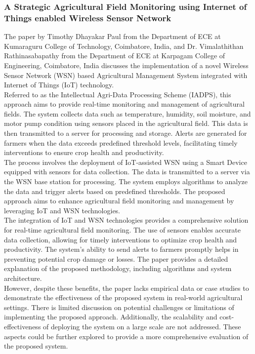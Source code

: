 \documentclass[12pt, a4paper]{article}
\begin{document}
\subsubsection{A Strategic Agricultural Field Monitoring using Internet of Things enabled Wireless Sensor Network}
The paper by Timothy Dhayakar Paul from the Department of ECE at Kumaraguru College of Technology, Coimbatore, India, and Dr. Vimalathithan Rathinasabapathy from the Department of ECE at Karpagam College of Engineering, Coimbatore, India \cite{paul2021strategic} discusses the implementation of a novel Wireless Sensor Network (WSN) based Agricultural Management System integrated with Internet of Things (IoT) technology.\\
Referred to as the Intellectual Agri-Data Processing Scheme (IADPS), this approach aims to provide real-time monitoring and management of agricultural fields. The system collects data such as temperature, humidity, soil moisture, and motor pump condition using sensors placed in the agricultural field. This data is then transmitted to a server for processing and storage. Alerts are generated for farmers when the data exceeds predefined threshold levels, facilitating timely interventions to ensure crop health and productivity.\\
The process involves the deployment of IoT-assisted WSN using a Smart Device equipped with sensors for data collection. The data is transmitted to a server via the WSN base station for processing. The system employs algorithms to analyze the data and trigger alerts based on predefined thresholds. The proposed approach aims to enhance agricultural field monitoring and management by leveraging IoT and WSN technologies.\\
The integration of IoT and WSN technologies provides a comprehensive solution for real-time agricultural field monitoring. The use of sensors enables accurate data collection, allowing for timely interventions to optimize crop health and productivity. The system's ability to send alerts to farmers promptly helps in preventing potential crop damage or losses. The paper provides a detailed explanation of the proposed methodology, including algorithms and system architecture.\\
However, despite these benefits, the paper lacks empirical data or case studies to demonstrate the effectiveness of the proposed system in real-world agricultural settings. There is limited discussion on potential challenges or limitations of implementing the proposed approach. Additionally, the scalability and cost-effectiveness of deploying the system on a large scale are not addressed. These aspects could be further explored to provide a more comprehensive evaluation of the proposed system. 
\end{document}
